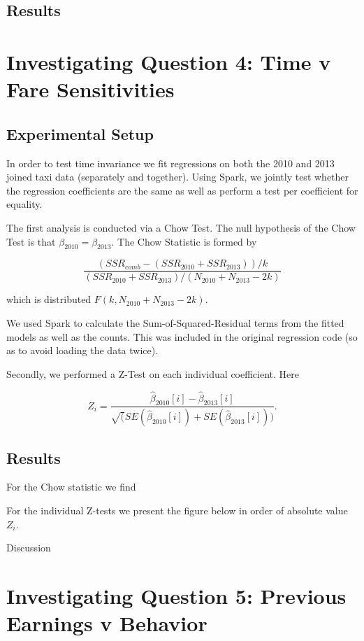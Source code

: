 \documentclass[twoside]{article}
\begin{document}
\begin{multicols}{2}
\subsection{Results}

\section{Investigating Question 4: Time v Fare Sensitivities}

\subsection{Experimental Setup}
In order to test time invariance we fit regressions on both the 2010 and 2013 joined taxi data (separately and together). Using Spark, we jointly test whether the regression coefficients are the same as well as perform a test per coefficient for equality. 

The first analysis is conducted via a Chow Test.  The null hypothesis of the Chow Test is that $\beta_{2010} = \beta_{2013}$.  The Chow Statistic is formed by 

$$\frac{(SSR_{comb} - (SSR_{2010} + SSR_{2013}))/k}{(SSR_{2010} + SSR_{2013})/(N_{2010} + N_{2013}-2k)}$$

\noindent which is distributed $F(k, N_{2010} + N_{2013}-2k)$. \cite{CHOW}  

We used Spark to calculate the Sum-of-Squared-Residual terms from the fitted models as well as the counts. This was included in the original regression code (so as to avoid loading the data twice). 

Secondly, we performed a Z-Test on each individual coefficient. Here

$$ Z_i = \frac{\hat{\beta}_{2010}[i] - \hat{\beta}_{2013}[i]}{\sqrt(SE(\hat{\beta}_{2010}[i]) + SE(\hat{\beta}_{2013}[i]))}.$$


\subsection{Results}

For the Chow statistic we find

For the individual Z-tests we present the figure below in order of absolute value $Z_i$.

Discussion


\section{Investigating Question 5: Previous Earnings v Behavior}

\end{multicols}
\end{document}
